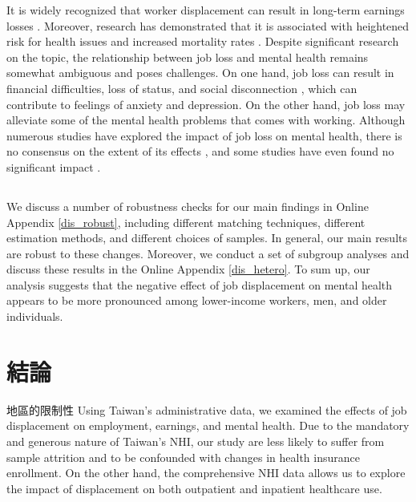 \documentclass[12pt]{article}
\begin{document}

It is widely recognized that worker displacement can result in long-term earnings losses \citep{Ruhm,Jacobson,lachowska}. Moreover, research has demonstrated that it is associated with heightened risk for health issues and increased mortality rates \citep{Sullivan,Kuhn,Schaller,eliason2009job,eliason2009does,Browning}. Despite significant research on the topic, the relationship between job loss and mental health remains somewhat ambiguous and poses challenges. On one hand, job loss can result in financial difficulties, loss of status, and social disconnection \citep{coope2015characteristics,canavan2021moderating}, which can contribute to feelings of anxiety and depression. On the other hand, job loss may alleviate some of the mental health problems that comes with working. Although numerous studies have explored the impact of job loss on mental health, there is no consensus on the extent of its effects \citep{cygan2017bounding}, and some studies have even found no significant impact \citep{salm2009does,keefe2002serious}.











\subsection{}
We discuss a number of robustness checks for our main findings in Online Appendix \ref{dis_robust}, including different matching techniques, different estimation methods, and different choices of samples. In general, our main results are robust to these changes. Moreover, we conduct a set of subgroup analyses and discuss these results in the Online Appendix \ref{dis_hetero}. To sum up, our analysis suggests that the negative effect of job displacement on mental health appears to be more pronounced among lower-income workers, men, and older individuals.

\section{結論}\label{conclusion}

地區的限制性 Using Taiwan's administrative data, we examined the effects of job displacement on employment, earnings, and mental health. Due to the mandatory and generous nature of Taiwan's NHI, our study are less likely to suffer from sample attrition and to be confounded with changes in health insurance enrollment. On the other hand, the comprehensive NHI data allows us to explore the impact of displacement on both outpatient and inpatient healthcare use.








\end{document}

